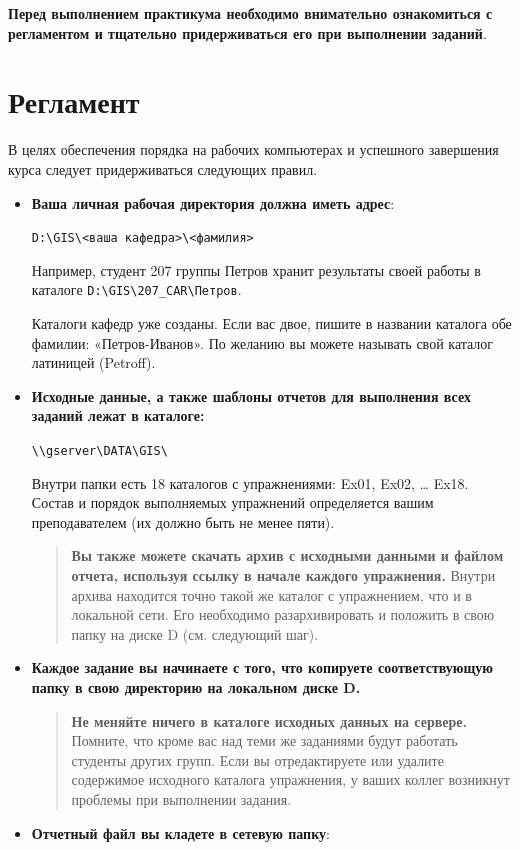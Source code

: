 \documentclass[]{book}
\theoremstyle{definition}
\theoremstyle{definition}
\theoremstyle{definition}
\theoremstyle{remark}
\begin{document}
\textbf{Перед выполнением практикума необходимо внимательно ознакомиться
с регламентом и тщательно придерживаться его при выполнении заданий}.

\section*{Регламент}

В целях обеспечения порядка на рабочих компьютерах и успешного
завершения курса следует придерживаться следующих правил.

\begin{itemize}
\item
  \textbf{Ваша личная рабочая директория должна иметь адрес}:

  \texttt{D:\textbackslash{}GIS\textbackslash{}\textless{}ваша\ кафедра\textgreater{}\textbackslash{}\textless{}фамилия\textgreater{}}

  Например, студент 207 группы Петров хранит результаты своей работы в
  каталоге
  \texttt{D:\textbackslash{}GIS\textbackslash{}207\_CAR\textbackslash{}Петров}.

  Каталоги кафедр уже созданы. Если вас двое, пишите в названии каталога
  обе фамилии: «Петров-Иванов». По желанию вы можете называть свой
  каталог латиницей (Petroff).
\item
  \textbf{Исходные данные, а также шаблоны отчетов для выполнения всех
  заданий лежат в каталоге:}

  \texttt{\textbackslash{}\textbackslash{}gserver\textbackslash{}DATA\textbackslash{}GIS\textbackslash{}}

  Внутри папки есть 18 каталогов с упражнениями: Ex01, Ex02, \ldots{}
  Ex18. Состав и порядок выполняемых упражнений определяется вашим
  преподавателем (их должно быть не менее пяти).

  \begin{quote}
  \textbf{Вы также можете скачать архив с исходными данными и файлом
  отчета, используя ссылку в начале каждого упражнения.} Внутри архива
  находится точно такой же каталог с упражнением, что и в локальной
  сети. Его необходимо разархивировать и положить в свою папку на диске
  D (см. следующий шаг).
  \end{quote}
\item
  \textbf{Каждое задание вы начинаете с того, что копируете
  соответствующую папку в свою директорию на локальном диске D.}

  \begin{quote}
  \textbf{Не меняйте ничего в каталоге исходных данных на сервере.}
  Помните, что кроме вас над теми же заданиями будут работать студенты
  других групп. Если вы отредактируете или удалите содержимое исходного
  каталога упражнения, у ваших коллег возникнут проблемы при выполнении
  задания.
  \end{quote}
\item
  \textbf{Отчетный файл вы кладете в сетевую папку}:


\end{itemize}
\end{document}
